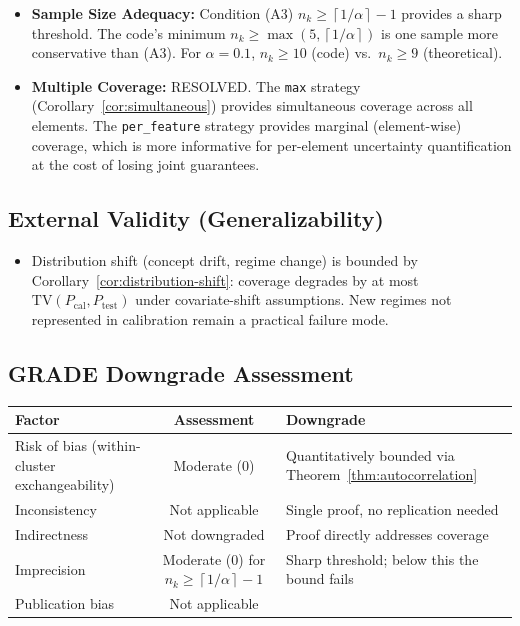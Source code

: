 \documentclass[11pt]{article}
\newcommand{\ceil}[1]{\left\lceil #1 \right\rceil}
\begin{document}
\begin{itemize}
    \item \textbf{Sample Size Adequacy:} Condition (A3) $n_k \geq \ceil{1/\alpha} - 1$ provides a sharp threshold. The code's minimum $n_k \geq \max(5, \ceil{1/\alpha})$ is one sample more conservative than (A3). For $\alpha = 0.1$, $n_k \geq 10$ (code) vs.\ $n_k \geq 9$ (theoretical).

    \item \textbf{Multiple Coverage:} RESOLVED. The \texttt{max} strategy (Corollary~\ref{cor:simultaneous}) provides simultaneous coverage across all elements. The \texttt{per\_feature} strategy provides marginal (element-wise) coverage, which is more informative for per-element uncertainty quantification at the cost of losing joint guarantees.
\end{itemize}

\subsection*{External Validity (Generalizability)}

\begin{itemize}
    \item Distribution shift (concept drift, regime change) is bounded by Corollary~\ref{cor:distribution-shift}: coverage degrades by at most $\text{TV}(P_{\text{cal}}, P_{\text{test}})$ under covariate-shift assumptions. New regimes not represented in calibration remain a practical failure mode.
\end{itemize}

\subsection*{GRADE Downgrade Assessment}

\begin{center}
\begin{tabular}{lcl}
\toprule
\textbf{Factor} & \textbf{Assessment} & \textbf{Downgrade} \\
\midrule
Risk of bias (within-cluster exchangeability) & Moderate (0) & Quantitatively bounded via Theorem~\ref{thm:autocorrelation} \\
Inconsistency & Not applicable & Single proof, no replication needed \\
Indirectness & Not downgraded & Proof directly addresses coverage \\
Imprecision & Moderate (0) for $n_k \geq \ceil{1/\alpha} - 1$ & Sharp threshold; below this the bound fails \\
Publication bias & Not applicable & \\
\bottomrule
\end{tabular}
\end{center}
\end{document}
